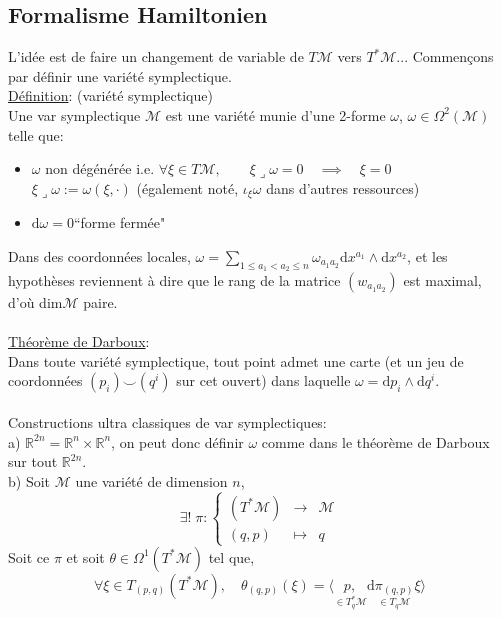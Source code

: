 \documentclass[a4paper,11pt]{article}
\renewcommand{\d}{{\mathrm{d}}}
\begin{document}
\subsection{Formalisme Hamiltonien}
L'idée est de faire un changement de variable de $T\mathcal{M}$ vers $T^*\mathcal{M}$... Commençons par définir une variété symplectique.
\\
\underline{Définition}: (variété symplectique)\\
Une var symplectique $\mathcal{M}$ est une variété munie d'une 2-forme $\omega$, $\omega \in \Omega^2(\mathcal{M})$ telle que:
\begin{itemize}
\item $\omega$ non dégénérée i.e. $\forall \xi\in T\mathcal{M}, \quad \quad \xi \lrcorner \omega = 0 \quad \implies \quad \xi =0$\\
$\xi \lrcorner \omega:= \omega(\xi,\cdot)$ (également noté, $\iota_\xi \omega$ dans d'autres ressources)
\item $\d \omega = 0$\quad\quad ``forme fermée"
\end{itemize}

Dans des coordonnées locales, $\omega = \sum_{1\leq a_1 < a_2\leq n} \omega_{a_1a_2} \d x^{a_1} \wedge \d x^{a_2}$, et les hypothèses reviennent à dire que le rang de la matrice $(w_{a_1a_2})$ est maximal, d'où dim$\mathcal{M}$ paire.\\
\\
\underline{Théorème de Darboux}:\\
Dans toute variété symplectique, tout point admet une carte (et un jeu de coordonnées $(p_i)\!\!\smile\!\!(q^i)$ sur cet ouvert) dans laquelle $\omega = \d p_i\wedge\d q^i$.\\
\\
Constructions ultra classiques de var symplectiques:\\
a) $\mathbb{R}^{2n}=\mathbb{R}^n\times\mathbb{R}^n$, on peut donc définir $\omega$ comme dans le théorème de Darboux sur tout $\mathbb{R}^{2n}$.
\\
b) Soit $\mathcal{M}$ une variété de dimension $n$, 
\begin{equation*}
\exists!\; \pi : \left\{\begin{matrix}
(T^*\mathcal{M}) & \to & \mathcal{M} \\
(q,p) & \mapsto & q
\end{matrix}\right.
\end{equation*}
Soit ce $\pi$ et soit $\theta \in \Omega^1 (T^*\mathcal{M})$ tel que,
$$\forall \xi \in T_{(p,q)}(T^*\mathcal{M}), \quad \theta_{(q,p)}(\xi) = \langle \underset{\in T_q^*\mathcal{M}}{p,} \underset{\in T_q\mathcal{M}}{\d \pi_{(q,p)} \xi} \rangle$$
\end{document}
